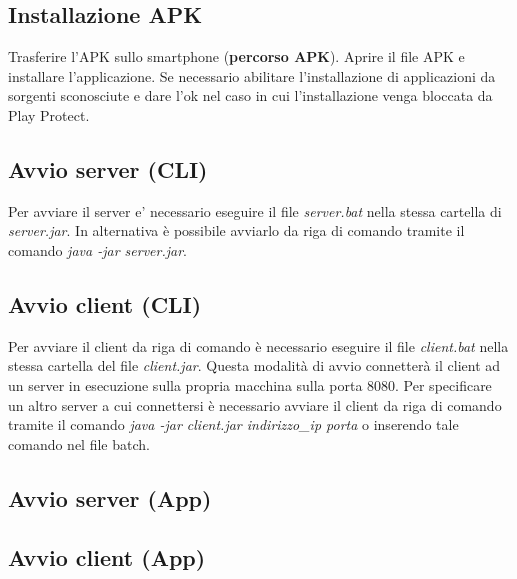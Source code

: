 \subsection{Installazione APK}
Trasferire l'APK sullo smartphone (\textbf{percorso APK}). Aprire il file APK e installare l'applicazione. Se necessario abilitare l'installazione di applicazioni da sorgenti sconosciute e dare l'ok nel caso in cui l'installazione venga bloccata da Play Protect.

\subsection{Avvio server (CLI)}
\noindent Per avviare il server e' necessario eseguire il file \textit{server.bat} nella stessa cartella di \textit{server.jar}. In alternativa è possibile avviarlo da riga di comando tramite il comando \textit{java -jar server.jar}.

\subsection{Avvio client (CLI)}
\noindent Per avviare il client da riga di comando è necessario eseguire il file \textit{client.bat} nella stessa cartella del file \textit{client.jar}. Questa modalità di avvio connetterà il client ad un server in esecuzione sulla propria macchina sulla porta 8080. Per specificare un altro server a cui connettersi è necessario
avviare il client da riga di comando tramite il comando \textit{java -jar client.jar indirizzo\_ip porta} o inserendo tale comando nel file batch.


\subsection{Avvio server (App)}


\subsection{Avvio client (App)}
\noindent

